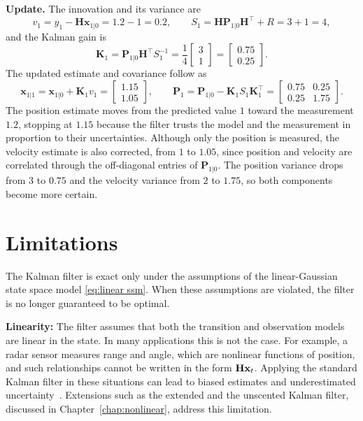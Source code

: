 \begin{example}
\textbf{Update.} The innovation and its variance are
\[
    v_1 = y_1 - \mathbf{H}\mathbf{x}_{1|0} = 1.2 - 1 = 0.2, \qquad
    S_1 = \mathbf{H}\mathbf{P}_{1|0}\mathbf{H}^\top + R = 3 + 1 = 4,
\]
and the Kalman gain is
\[
    \mathbf{K}_1 = \mathbf{P}_{1|0}\mathbf{H}^\top S_1^{-1} = \frac{1}{4}\begin{bmatrix} 3 \\ 1 \end{bmatrix} = \begin{bmatrix} 0.75 \\ 0.25 \end{bmatrix}.
\]
The updated estimate and covariance follow as
\[
    \mathbf{x}_{1|1} = \mathbf{x}_{1|0} + \mathbf{K}_1 v_1 = \begin{bmatrix} 1.15 \\ 1.05 \end{bmatrix}, \qquad
    \mathbf{P}_1 = \mathbf{P}_{1|0} - \mathbf{K}_1 S_1 \mathbf{K}_1^\top = \begin{bmatrix} 0.75 & 0.25 \\ 0.25 & 1.75 \end{bmatrix}.
\]
The position estimate moves from the predicted value $1$ toward the measurement $1.2$, stopping at $1.15$ because the filter trusts the model and the measurement in proportion to their uncertainties. Although only the position is measured, the velocity estimate is also corrected, from $1$ to $1.05$, since position and velocity are correlated through the off-diagonal entries of $\mathbf{P}_{1|0}$. The position variance drops from $3$ to $0.75$ and the velocity variance from $2$ to $1.75$, so both components become more certain.
\end{example}

\section{Limitations}\label{sec:kf-limitations}
The Kalman filter is exact only under the assumptions of the linear-Gaussian state space model \eqref{eq:linear ssm}. When these assumptions are violated, the filter is no longer guaranteed to be optimal.

\textbf{Linearity:}
The filter assumes that both the transition and observation models are linear in the state. In many applications this is not the case. For example, a radar sensor measures range and angle, which are nonlinear functions of position, and such relationships cannot be written in the form $\mathbf{H}\mathbf{x}_t$. Applying the standard Kalman filter in these situations can lead to biased estimates and underestimated uncertainty~\cite[Ch.~5]{sarkka:bayesian_filtering}. Extensions such as the extended  and the unscented Kalman filter, discussed in Chapter~\ref{chap:nonlinear}, address this limitation.

